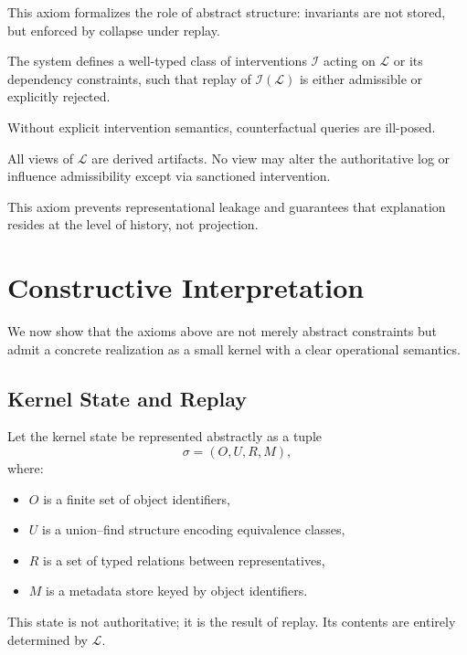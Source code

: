 \documentclass[11pt]{article}
\begin{document}
This axiom formalizes the role of abstract structure: invariants are not stored, but enforced by collapse under replay.

\begin{axiom}
\label{ax:intervention}
The system defines a well-typed class of interventions $\mathcal{I}$ acting on $\mathcal{L}$ or its dependency constraints, such that replay of $\mathcal{I}(\mathcal{L})$ is either admissible or explicitly rejected.
\end{axiom}

Without explicit intervention semantics, counterfactual queries are ill-posed.

\begin{axiom}
\label{ax:views}
All views of $\mathcal{L}$ are derived artifacts. No view may alter the authoritative log or influence admissibility except via sanctioned intervention.
\end{axiom}

This axiom prevents representational leakage and guarantees that explanation resides at the level of history, not projection.

\section{Constructive Interpretation}

We now show that the axioms above are not merely abstract constraints but admit a concrete realization as a small kernel with a clear operational semantics.

\subsection{Kernel State and Replay}

Let the kernel state be represented abstractly as a tuple
\[
\sigma = (O, U, R, M),
\]
where:
\begin{itemize}
  \item $O$ is a finite set of object identifiers,
  \item $U$ is a union--find structure encoding equivalence classes,
  \item $R$ is a set of typed relations between representatives,
  \item $M$ is a metadata store keyed by object identifiers.
\end{itemize}

This state is not authoritative; it is the result of replay. Its contents are entirely determined by $\mathcal{L}$.
\end{document}
